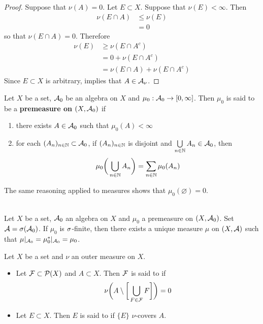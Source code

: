 \documentclass{book}
\begin{document}
	\begin{proof}
		Suppose that $\nu(A) = 0$. Let $E \subset X$. Suppose that $\nu(E) < \infty$. Then 
		\begin{align*}
			\nu(E \cap A) 
			& \leq \nu(E) \\
			& = 0
		\end{align*}
		so that $\nu(E \cap A) = 0$. Therefore
		\begin{align*}
			\nu(E)
			& \geq \nu(E \cap A^c) \\
			& = 0 + \nu(E \cap A^c) \\
			& = \nu(E \cap A) + \nu(E \cap A^c) 
		\end{align*}
		Since $E \subset X$ is arbitrary,  implies that $A \in \mathcal{A}_{\nu}$.
	\end{proof}
	
	\begin{defn}  
		Let $X$ be a set, $\mathcal{A}_0$ be an algebra on $X$ and $\mu_0:\mathcal{A}_0 \rightarrow [0, \infty]$. Then $\mu_0$ is said to be a \textbf{premeasure on $(X,\mathcal{A}_0)$} if 
		\begin{enumerate}
			\item there exists $A \in \mathcal{A}_0$ such that $\mu_0(A)< \infty$
			\item for each $(A_n)_{n \in \mathbb{N}} \subset \mathcal{A}_0$, if $(A_n)_{n \in \mathbb{N}}$ is disjoint and $\bigcup\limits_{n \in \mathbb{N}}A_n \in \mathcal{A}_0$, then $$\mu_0 \bigg(\bigcup_{n\in \mathbb{N}}A_n \bigg) = \sum_{n \in \mathbb{N}}\mu_0(A_n)$$
		\end{enumerate}
	\end{defn}
	
	\begin{note}
		The same reasoning applied to measures shows that $\mu_0(\varnothing) = 0$.
	\end{note}
	
	\begin{thm}   \\
		Let $X$ be a set, $\mathcal{A}_0$ an algebra on $X$ and $\mu_0$ a premeasure on $(X,\mathcal{A}_0)$. Set $\mathcal{A} = \sigma(\mathcal{A}_0)$. If $\mu_0$ is $\sigma$-finite, then there exists a unique measure $\mu$ on $(X, \mathcal{A})$ such that $\mu|_{\mathcal{A}_0} = \mu_0^*|_{\mathcal{A}_0} = \mu_0$. 
	\end{thm}


	
	
	
	
	
	\begin{defn}  
		Let $X$ be a set and $\nu$ an outer measure on $X$. 
		\begin{itemize}
			\item Let $\mathcal{F} \subset \mathcal{P}(X)$ and $A \subset X$. Then $\mathcal{F}$ is said to  if 
			$$\nu \bigg(A \setminus \bigg[ \bigcup_{F \in \mathcal{F}} F \bigg] \bigg) = 0$$
			\item Let $E \subset X$. Then $E$ is said to  if $\{E\}$ $\nu$-covers $A$.
		\end{itemize}
	\end{defn}
	
\end{document}
